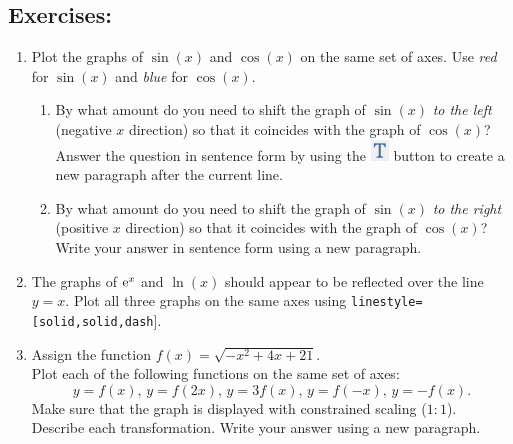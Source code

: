 \subsection*{Exercises:}
\begin{enumerate}
    \item Plot the graphs of $\sin (x)$ and $\cos (x)$ on the same set of axes. Use \textit{red} for $\sin (x)$ and \textit{blue} for $\cos (x)$.  
    \begin{enumerate}
    	\item By what amount do you need to shift the graph of $\sin (x)$ \textit{to the left} (negative $x$ direction) so that it coincides with the graph of $\cos (x)$? Answer the question in sentence form by using the \includegraphics[width=0.04\textwidth]{tutorials/figures/new_text.PNG} button to create a new paragraph after the current line.
    	\item By what amount do you need to shift the graph of $\sin (x)$ \textit{to the right} (positive $x$ direction) so that it coincides with the graph of $\cos (x)$? Write your answer in sentence form using a new paragraph.
    \end{enumerate}
    
    \item The graphs of ${\rm e}^x$ and $\ln(x)$ should appear to be reflected over the line $y=x$. Plot all three graphs on the same axes using \texttt{linestyle=[solid,solid,dash}].
	\item Assign the function $f(x) = \sqrt{-x^2 + 4x + 21}$. \\Plot each of the following functions on the same set of axes:
	\[y = f(x), \, y = f(2x), \, y = 3f(x), \, y = f(-x), \, y = -f(x).\]
	Make sure that the graph is displayed with constrained scaling ($1:1$). Describe each transformation. Write your answer using a new paragraph.
	

\end{enumerate}
